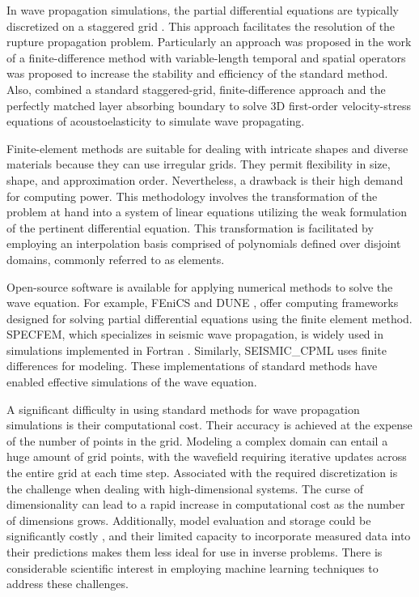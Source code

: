 \documentclass[11pt,twoside]{article}
\begin{document}
In wave propagation simulations, the partial differential equations are typically discretized on a staggered grid 
\citep{madariaga_dynamics_1976,Virieux1986}. This approach facilitates the resolution of the rupture propagation 
problem. Particularly an approach was proposed in the work of  a finite-difference method 
with variable-length temporal and spatial operators was proposed to increase the stability and efficiency of the 
standard method. Also,  combined a standard staggered-grid, finite-difference 
approach and the perfectly matched layer absorbing boundary to solve 3D first-order velocity-stress equations of 
acoustoelasticity to simulate wave propagating.

Finite-element methods are suitable for dealing with intricate shapes and diverse materials because they can use 
irregular grids. They permit flexibility in size, shape, and approximation order. Nevertheless, a drawback is their 
high demand for computing power. This methodology involves the transformation of the problem at hand into a system 
of linear equations utilizing the weak formulation of the pertinent differential equation. This transformation is 
facilitated by employing an interpolation basis comprised of polynomials defined over disjoint domains, commonly 
referred to as elements.

Open-source software is available for applying numerical methods to solve the wave equation. For example, FEniCS 
and DUNE \citep{FEniCS,sander_dune_2020}, offer computing frameworks designed for solving partial differential 
equations using the finite element method. SPECFEM, which specializes in seismic wave propagation, is widely used 
in simulations implemented in Fortran \citep{dimitri_komatitsch_2023_10415228,komatitsch_2024_10823181}. Similarly, 
SEISMIC\_CPML \citep{komatitsch_unsplit_2007} uses finite differences for modeling. These implementations of 
standard methods have enabled effective simulations of the wave equation.

A significant difficulty in using standard methods for wave propagation simulations is their computational cost. Their 
accuracy is achieved at the expense of the number of points in the grid. Modeling a complex domain can entail a huge 
amount of grid points, with the wavefield requiring iterative updates across the entire grid at each time step. 
Associated with the required discretization is the challenge when dealing with high-dimensional systems. The curse 
of dimensionality can lead to a rapid increase in computational cost as the number of dimensions grows. Additionally, 
model evaluation and storage could be significantly costly , and their 
limited capacity to incorporate measured data into their predictions makes them less ideal for use in inverse problems. 
There is considerable scientific interest in employing machine learning techniques to address these challenges.
\end{document}
